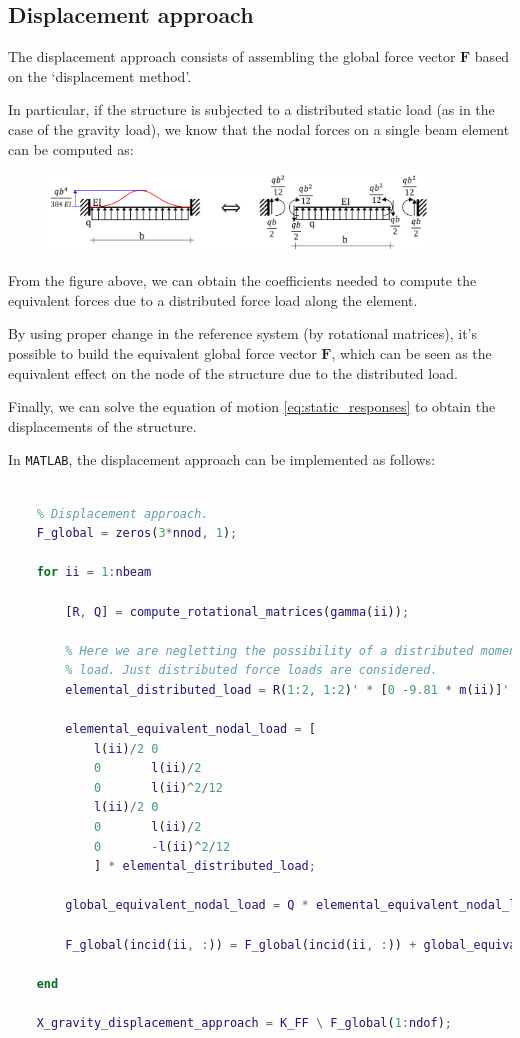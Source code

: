 \subsection{Displacement approach}
\label{subsec:displacement_approach}

The displacement approach consists of assembling the global force vector $\mathbf{F}$ based on the `displacement method'.

In particular, if the structure is subjected to a distributed static load (as in the case of the gravity load), we know that the nodal forces on a single beam element can be computed as:

\begin{figure}[H]
    \centering
    \includegraphics[width=0.9\textwidth]{img/displacement-method.png}
    \label{fig:displacement_method}
\end{figure}

From the figure above, we can obtain the coefficients needed to compute the equivalent forces due to a distributed force load along the element.

By using proper change in the reference system (by rotational matrices), it's possible to build the equivalent global force vector $\mathbf{F}$, which can be seen as the equivalent effect on the node of the structure due to the distributed load.

Finally, we can solve the equation of motion \ref{eq:static_responses} to obtain the displacements of the structure.

In \texttt{MATLAB}, the displacement approach can be implemented as follows:

\begin{lstlisting}[language=Matlab]

    % Displacement approach.
    F_global = zeros(3*nnod, 1);

    for ii = 1:nbeam

        [R, Q] = compute_rotational_matrices(gamma(ii));

        % Here we are negletting the possibility of a distributed momentum
        % load. Just distributed force loads are considered.
        elemental_distributed_load = R(1:2, 1:2)' * [0 -9.81 * m(ii)]';

        elemental_equivalent_nodal_load = [
            l(ii)/2 0
            0       l(ii)/2
            0       l(ii)^2/12
            l(ii)/2 0
            0       l(ii)/2
            0       -l(ii)^2/12
            ] * elemental_distributed_load;

        global_equivalent_nodal_load = Q * elemental_equivalent_nodal_load;

        F_global(incid(ii, :)) = F_global(incid(ii, :)) + global_equivalent_nodal_load;

    end

    X_gravity_displacement_approach = K_FF \ F_global(1:ndof);

\end{lstlisting}